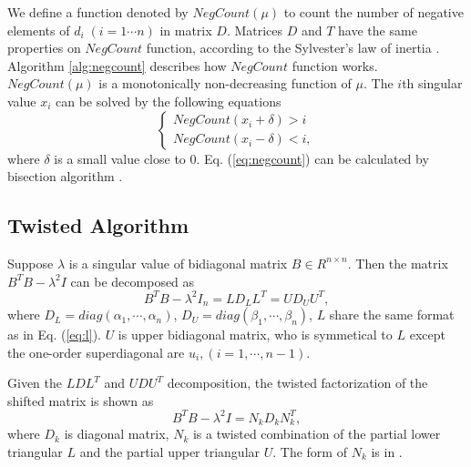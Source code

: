 We define a function denoted by $NegCount(\mu)$ to count the number of negative elements of $d_i\;(i=1\cdots n)$ in matrix $D$.
Matrices $D$ and $T$ have the same properties on $NegCount$ function, according to the Sylvester's law of inertia \cite{13sylvester}.
Algorithm \ref{alg:negcount} describes how $NegCount$ function works.
$NegCount(\mu)$ is a monotonically non-decreasing function of $\mu$. The $i$th singular value $x_i$ can be solved by the following equations
\begin{equation}
\left \{
\begin{aligned}
NegCount(x_i+\delta) > i \\
NegCount(x_i-\delta) < i ,
\end{aligned}
\right .
\label{eq:negcount}
\end{equation}
where $\delta$ is a small value close to 0. Eq. (\ref{eq:negcount}) can be calculated by bisection algorithm \cite{95ETNAbisecion}.


\subsection{Twisted Algorithm}
Suppose $\lambda$ is a singular value of bidiagonal matrix $B \in R^{n \times n}$.
Then the matrix $B^T B - \lambda^2 I$ can be decomposed as
\begin{equation}
B^T B - \lambda^2 I_n = L D_L L^T = U D_U U^T ,
\end{equation}
where $D_L=diag(\alpha_1, \cdots, \alpha_n)$, $D_U = diag(\beta_1, \cdots, \beta_n)$, 
$L$ share the same format as in Eq. (\ref{eq:l}).
$U$ is upper bidiagonal matrix, who is symmetical to $L$ except the one-order superdiagonal are $u_{i}, (i=1,\cdots,n-1)$. 

Given the $LDL^T$ and $UDU^T$ decomposition, the twisted factorization of the shifted matrix is shown as
\begin{equation}
B^T B - \lambda^2 I = N_k D_k N_k^T ,
\label{eq:twisted}
\end{equation}
where $D_k$ is diagonal matrix, $N_k$ is a twisted combination of the partial lower triangular $L$ and the partial upper triangular $U$. The form of $N_k$ is in \cite{09NLAAtwisted}.

